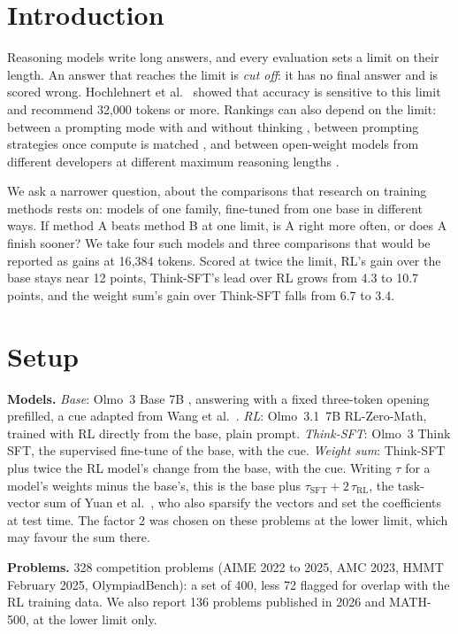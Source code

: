 \documentclass[10pt]{article}
\begin{document}
\section{Introduction}

Reasoning models write long answers, and every evaluation sets a limit on their length. An answer that reaches
the limit is \emph{cut off}: it has no final answer and is scored wrong. Hochlehnert et al.\
\cite{hochlehnert2025sober} showed that accuracy is sensitive to this limit and recommend 32{,}000 tokens or
more. Rankings can also depend on the limit: between a prompting mode with and without thinking
\cite{ma2025nothinking}, between prompting strategies once compute is matched \cite{wang2024tokeneconomies}, and
between open-weight models from different developers at different maximum reasoning lengths
\cite{samadi2025ioi}.

We ask a narrower question, about the comparisons that research on training methods rests on: models of one
family, fine-tuned from one base in different ways. If method A beats method B at one limit, is A right more
often, or does A finish sooner? We take four such models and three comparisons that would be reported as gains
at 16{,}384 tokens. Scored at twice the limit, RL's gain over the base stays near 12 points, Think-SFT's lead over RL grows from
4.3 to 10.7 points, and the weight sum's gain over Think-SFT falls from 6.7 to 3.4.

\section{Setup}

\textbf{Models.} \emph{Base}: Olmo~3 Base 7B \cite{olmo2025olmo3}, answering with a fixed three-token opening
prefilled, a cue adapted from Wang et al.\ \cite{wang2026base}. \emph{RL}: Olmo~3.1~7B RL-Zero-Math, trained with RL
directly from the base, plain prompt. \emph{Think-SFT}: Olmo~3 Think SFT, the supervised fine-tune of the base,
with the cue. \emph{Weight sum}: Think-SFT plus twice the RL model's change from the base, with the cue. Writing
$\tau$ for a model's weights minus the base's, this is the base plus $\tau_{\mathrm{SFT}} + 2\,\tau_{\mathrm{RL}}$,
the task-vector sum of Yuan et al.\ \cite{yuan2026dots}, who also sparsify the vectors and set the coefficients
at test time. The factor 2 was chosen on these problems at the lower limit, which may favour the sum there.

\textbf{Problems.} 328 competition problems (AIME 2022 to 2025, AMC 2023, HMMT February 2025, OlympiadBench): a
set of 400, less 72 flagged for overlap with the RL training data. We also report 136 problems published in
2026 and MATH-500, at the lower limit only.
\end{document}
